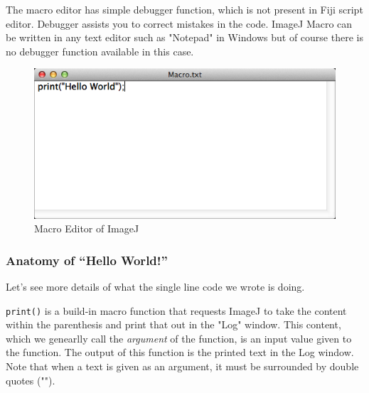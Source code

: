 \documentclass[11pt,a4paper,oneside]{report}
\newcommand{\ilcom}[1]{\texttt{\small#1}}
\begin{document}
The macro editor has simple debugger function, which is not present in Fiji script editor. Debugger assists you to correct mistakes in the code. ImageJ Macro can be written in any text editor such as "Notepad" in Windows but of course there is no debugger function available in this case.

\begin{figure}[htbp]
\begin{center}
\includegraphics[scale=0.6]{fig/editor_helloworld_IJ_simple.png}
\caption{Macro Editor of ImageJ} \label{fig_MacroEditor}
\end{center}
\end{figure}


\subsubsection{Anatomy of ``Hello World!''}

Let's see more details of what the single line code we wrote is doing.

\ilcom{print()} is a build-in macro function that requests ImageJ to take the content within the parenthesis and print that out in the "Log" window. This content, which we genearlly call the \textit{argument} of the function, is an input value given to the function. The output of this function is the printed text in the Log window. Note that when a text is given as an argument, it must be surrounded by double quotes ("").
 
\end{document}
